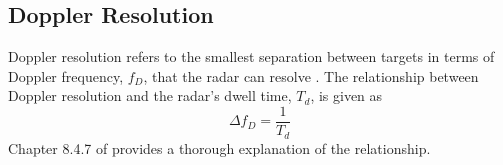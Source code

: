 \documentclass[class=report,11pt,crop=false]{standalone}
\begin{document}
    \subsection{Doppler Resolution} %
    Doppler resolution refers to the smallest separation between targets in terms of Doppler frequency, $f_D$, that the radar can resolve \cite{pomr}. The relationship between Doppler resolution and the radar's dwell time, $T_d$, is given as
    \begin{equation} \label{eq:doppler_resolution}
        \Delta f_D = \frac{1}{T_{d}}
    \end{equation}
    Chapter 8.4.7 of \cite{pomr} provides a thorough explanation of the relationship. %

\end{document}
